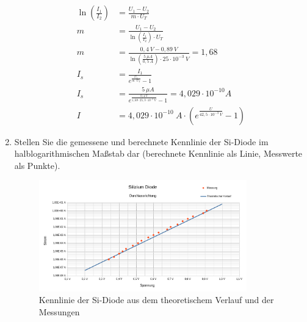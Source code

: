 \begin{enumerate}[label=\alph*)]
\begin{align*}
		      \ln\left(\frac{I_1}{I_2}\right)            & =  \frac{U_1-U_2}{m\cdot U_T}                                \\
		      m                                          & =  \frac{U_1-U_2}{\ln\left(\frac{I_1}{I_2}\right) \cdot U_T} \\
		      m                                          & =  \frac{0,4\ V - 0,89\ V}
		      {\ln\left(\frac{5\ \mu A}{0,5\ A}\right) \cdot 25\cdot 10^{-3}\ V} = 1,68                                 \\
		      I_s                                        & = \frac{I_1}{e^\frac{U_1}{m\cdot U_T} - 1}                   \\
		      I_s                                        & = \frac{5\ \mu A}{e^\frac{0,4\ V}
		      {1,68\cdot 25,3\cdot 10^{-3}\ V} - 1} = 4,029\cdot 10^{-10} A                                             \\
		      I                                          & = 4,029\cdot 10^{-10}\ A\cdot
		      \left(e^{\frac{U}{42,5\cdot 10^{-3}\ V}}-1\right)
	      \end{align*}
	      \pagebreak

	\item Stellen Sie die gemessene und berechnete Kennlinie der Si-Diode im halblogarithmischen Maßstab dar (berechnete Kennlinie als Linie, Messwerte als Punkte).

	      \begin{figure}[h!]
		      \begin{center}
			      \includegraphics[width=0.85\textwidth]{img/4.1.a.7}
			      \caption{Kennlinie der Si-Diode aus dem theoretischem Verlauf und der Messungen}
		      \end{center}
	      \end{figure}


\end{enumerate}

